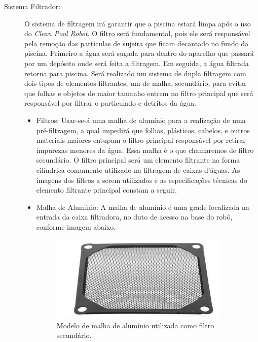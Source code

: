 \begin{description}
\item[Sistema Filtrador:] O sistema de filtragem irá garantir que a piscina
estará limpa após o uso do \textit{Clean Pool Robot}. O filtro será fundamental,
pois ele será responsável pela remoção das partículas de sujeira que ficam decantado
no fundo da piscina. Primeiro a água será sugada para dentro do aparelho que passará por
um depósito onde será feita a filtragem. Em seguida, a água filtrada retorna para
piscina. Será realizado um sistema de dupla filtragem com dois tipos de elementos
filtrantes, um de malha, secundário, para evitar que folhas e objetos de maior
tamanho entrem no filtro principal que será responsável por filtrar o particulado
e detritos da água.
\begin{itemize}
  \item Filtros: Usar-se-á uma malha de alumínio para a realização de uma
  pré-filtragem, a qual impedirá que folhas, plásticos, cabelos, e outros
  materiais maiores entupam o filtro principal responsável por retirar impurezas
  menores da água. Essa malha é o que chamaremos de filtro secundário. O filtro
  principal será um elemento filtrante na forma cilíndrica comumente utilizado
  na filtragem de caixas d’águas. As imagens dos filtros a serem utilizados e as
  especificações técnicas do elemento filtrante principal constam a seguir.
  \item Malha de Alumínio: A malha de alumínio é uma grade localizada na entrada
  da caixa filtradora, no duto de acesso na base do robô, conforme imagem abaixo.
  \par
  \begin{figure}[h]
    \centering
    \includegraphics[width=0.9\textwidth]{figures/mesh-aluminium.png}
    \caption{Modelo de malha de alumínio utilizada como filtro secundário.}
    \label{fig:mesh-aluminium}
  \end{figure}
  \FloatBarrier
\end{itemize}


\end{description}
